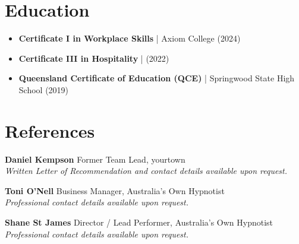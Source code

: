 \documentclass[11pt, a4paper]{article}
\begin{document}
\section{Education}
\begin{itemize}
    \item \textbf{Certificate I in Workplace Skills} | Axiom College (2024)
    \item \textbf{Certificate III in Hospitality} | (2022)
    \item \textbf{Queensland Certificate of Education (QCE)} | Springwood State High School (2019)
\end{itemize}

\section{References}

\textbf{Daniel Kempson} \hfill Former Team Lead, yourtown \\
\textit{Written Letter of Recommendation and contact details available upon request.}

\vspace{6pt}

\textbf{Toni O'Nell} \hfill Business Manager, Australia's Own Hypnotist \\
\textit{Professional contact details available upon request.}

\vspace{6pt}

\textbf{Shane St James} \hfill Director / Lead Performer, Australia's Own Hypnotist \\
\textit{Professional contact details available upon request.}
\end{document}
